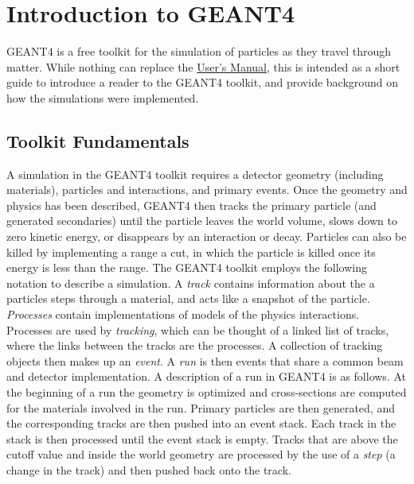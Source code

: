 \chapter{Introduction to GEANT4}
\label{chap:G4Intro}
GEANT4 is a free toolkit for the simulation of particles as they travel through matter.
While nothing can replace the \href{http://geant4.web.cern.ch/geant4/G4UsersDocuments/UsersGuides/ForApplicationDeveloper/html/index.html}{User's Manual}, this is intended as a short guide to introduce a reader to the GEANT4 toolkit, and provide background on how the simulations were implemented.

\section{Toolkit Fundamentals}
A simulation in the GEANT4 toolkit requires a detector geometry (including materials), particles and interactions, and primary events.
Once the geometry and physics has been described, GEANT4 then tracks the primary particle (and generated secondaries) until the particle leaves the world volume, slows down to zero kinetic energy, or disappears by an interaction or decay. 
Particles can also be killed by implementing a range a cut, in which the particle is killed once its energy is less than the range.
The GEANT4 toolkit employs the following notation to describe a simulation.
A \textit{track} contains information about the a particles steps through a material, and acts like a snapshot of the particle.
\textit{Processes} contain implementations of models of the physics interactions.
Processes are used by \textit{tracking}, which can be thought of a linked list of tracks, where the links between the tracks are the processes.
A collection of tracking objects then makes up an \textit{event}.
A \textit{run} is then events that share a common beam and detector implementation.
A description of a run in GEANT4 is as follows.
At the beginning of a run the geometry is optimized and cross-sections are computed for the materials involved in the run.
Primary particles are then generated, and the corresponding tracks are then pushed into an event stack.
Each track in the stack is then processed until the event stack is empty.
Tracks that are above the cutoff value and inside the world geometry are processed by the use of a \textit{step} (a change in the track) and then pushed back onto the track.

